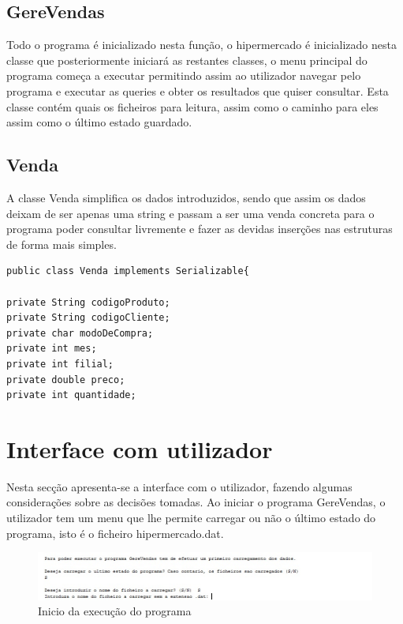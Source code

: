 \section{GereVendas}

Todo o programa é inicializado nesta função, o hipermercado é inicializado nesta classe que posteriormente iniciará as restantes classes, o menu principal do programa começa  a executar permitindo assim ao utilizador navegar pelo programa e executar as queries e obter os resultados que quiser consultar.
Esta classe contém quais os ficheiros para leitura, assim como o caminho para eles assim como o último estado guardado. 

\section{Venda}

A classe Venda simplifica os dados introduzidos, sendo que assim os dados deixam de ser apenas uma string e passam a ser uma venda concreta para o programa poder consultar livremente e fazer as devidas inserções nas estruturas de forma mais simples.


\begin{verbatim}
public class Venda implements Serializable{

private String codigoProduto;
private String codigoCliente;
private char modoDeCompra;
private int mes;
private int filial;
private double preco;
private int quantidade;
\end{verbatim}



\chapter{Interface com utilizador}

Nesta secção apresenta-se a interface com o utilizador, fazendo algumas considerações sobre as decisões tomadas.
Ao iniciar o programa GereVendas, o utilizador tem um menu que lhe permite carregar ou não o último estado do programa, isto é o ficheiro hipermercado.dat. 

\begin{figure}[h!]
	\includegraphics[scale=1]{IntroduzirUmFicheiroStream.jpg}  
	\caption{Inicio da execução do programa }  
\end{figure}

